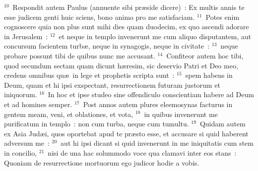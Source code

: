 ${}^{10}$~Respondit autem Paulus (annuente sibi pr\ae side dicere)~: Ex multis annis te esse judicem genti huic sciens, bono animo pro me satisfaciam.
${}^{11}$~Potes enim cognoscere quia non plus sunt mihi dies quam duodecim, ex quo ascendi adorare in Jerusalem~:
${}^{12}$~et neque in templo invenerunt me cum aliquo disputantem, aut concursum facientem turb\ae , neque in synagogis, neque in civitate~:
${}^{13}$~neque probare possunt tibi de quibus nunc me accusant.
${}^{14}$~Confiteor autem hoc tibi, quod secundum sectam quam dicunt h\ae resim, sic deservio Patri et Deo meo, credens omnibus qu\ae\ in lege et prophetis scripta sunt~:
${}^{15}$~spem habens in Deum, quam et hi ipsi exspectant, resurrectionem futuram justorum et iniquorum.
${}^{16}$~In hoc et ipse studeo sine offendiculo conscientiam habere ad Deum et ad homines semper.
${}^{17}$~Post annos autem plures eleemosynas facturus in gentem meam, veni, et oblationes, et vota,
${}^{18}$~in quibus invenerunt me purificatum in templo~: non cum turba, neque cum tumultu.
${}^{19}$~Quidam autem ex Asia Jud\ae i, quos oportebat apud te pr\ae sto esse, et accusare si quid haberent adversum me~:
${}^{20}$~aut hi ipsi dicant si quid invenerunt in me iniquitatis cum stem in concilio,
${}^{21}$~nisi de una hac solummodo voce qua clamavi inter eos stans~: Quoniam de resurrectione mortuorum ego judicor hodie a vobis.


